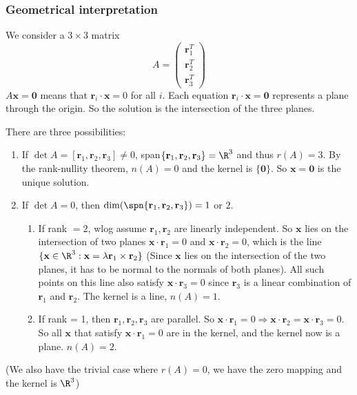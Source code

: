 \documentclass[a4paper]{article}
\begin{document}
\subsubsection{Geometrical interpretation}
We consider a $3\times 3$ matrix
\[
  A = \begin{pmatrix} \mathbf{r}_1^T\\\mathbf{r}_2^T\\\mathbf{r}_3^T\end{pmatrix}
\]
$A\mathbf{x} = \mathbf{0}$ means that $\mathbf{r}_i\cdot \mathbf{x} = 0$ for all $i$. Each equation $\mathbf{r}_i\cdot \mathbf{x} = \mathbf{0}$ represents a plane through the origin. So the solution is the intersection of the three planes.

There are three possibilities:
\begin{enumerate}
  \item If $\det A =[\mathbf{r}_1, \mathbf{r}_2, \mathbf{r}_3] \not= 0$, span$\{\mathbf{r}_1, \mathbf{r}_2, \mathbf{r}_3\} = \R^3$ and thus $r(A) = 3$. By the rank-nullity theorem, $n(A) = 0$ and the kernel is $\{\mathbf{0}\}$. So $\mathbf{x} = \mathbf{0}$ is the unique solution.
  \item If $\det A = 0$, then $\dim(\spn\{\mathbf{r}_1, \mathbf{r}_2, \mathbf{r}_3\}) = 1$ or $2$.
    \begin{enumerate}
      \item If rank $= 2$, wlog assume $\mathbf{r}_1, \mathbf{r}_2$ are linearly independent. So $\mathbf{x}$ lies on the intersection of two planes $\mathbf{x}\cdot \mathbf{r}_1 = 0$ and $\mathbf{x}\cdot \mathbf{r}_2 = 0$, which is the line $\{\mathbf{x}\in \R^3: \mathbf{x} = \lambda \mathbf{r}_1\times \mathbf{r}_2\}$ (Since $\mathbf{x}$ lies on the intersection of the two planes, it has to be normal to the normals of both planes). All such points on this line also satisfy $\mathbf{x}\cdot\mathbf{r}_3 = 0$ since $\mathbf{r}_3$ is a linear combination of $\mathbf{r}_1$ and $\mathbf{r}_2$. The kernel is a line, $n(A) = 1$.
      \item If rank = 1, then $\mathbf{r}_1, \mathbf{r}_2, \mathbf{r}_3$ are parallel. So $\mathbf{x}\cdot \mathbf{r}_1 = 0 \Rightarrow \mathbf{x}\cdot \mathbf{r}_2 = \mathbf{x}\cdot \mathbf{r}_3 = 0$. So all $\mathbf{x}$ that satisfy $\mathbf{x}\cdot \mathbf{r}_1 = 0$ are in the kernel, and the kernel now is a plane. $n(A) = 2$.
    \end{enumerate}
\end{enumerate}
(We also have the trivial case where $r(A) = 0$, we have the zero mapping and the kernel is $\R^3$)
\end{document}
